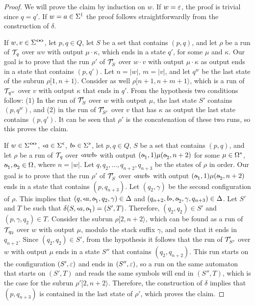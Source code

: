 	\begin{proof}
		We will prove the claim by induction on $w$. If $w = \varepsilon$, the proof is trivial since $q = q'$. If $w = a\in\Sigma^{\texttt{|}}$ the proof follows straightforwardly from the construction of $\delta$.
		
		If $w,v\in\Sigma^{\texttt{<*>}}$, let $p,q\in Q$, let $S$ be a set that contains $(p,q)$, and let $\rho$ be a run of $\mathcal{T}\!_q$ over $wv$ with output $\mu\cdot\kappa$, which ends in a state $q'$, for some $\mu$ and $\kappa$. 
		Our goal is to prove that the run $\rho'$ of $\mathcal{T}\!'_S$ over $w\cdot v$ with output $\mu\cdot \kappa$ as output ends in a state that contains $(p,q')$. 
		Let $n = \vert w\vert$, $m = \vert v \vert$, and let $q^w$ be the last state of the subrun $\rho[1,n+1\rangle$. 
		Consider as well $\rho[n+1,n+m+1\rangle$, which is a run of $\mathcal{T}\!_{q^w}$ over $v$ with output $\kappa$ that ends in $q'$. 
		From the hypothesis two conditions follow: 
		(1) In the run of $\mathcal{T}\!'_S$ over $w$ with output $\mu$, the last state $S'$ contains $(p,q^w)$, and 
		(2) in the run of $\mathcal{T}\!'_{S'}$ over $v$ that has $\kappa$ as output the last state contains $(p,q')$. 
		It can be seen that $\rho'$ is the concatenation of these two runs, so this proves the claim.
		
		If $w\in\Sigma^{\texttt{<*>}}$, ${\scriptsize\texttt{<}} a\in\Sigma^{\texttt{<}}$, $b{\scriptsize\texttt{>}}\in\Sigma^{\texttt{>}}$, let $p,q\in Q$, $S$ be a set that contains $(p,q)$, and let $\rho$ be a run of $\mathcal{T}\!_q$ over ${\scriptsize\texttt{<}} awb{\scriptsize\texttt{>}}$ with output $(\oout_1, 1)\mu(\oout_2, n+2)$ for some $\mu\in\Omega^*$, $\oout_1,\oout_2\in\oalph$, where $n = |w|$. 
		Let $q, q_2, \ldots, q_{n+2}, q_{n+3}$ be the states of $\rho$ in order. 
		Our goal is to prove that the run $\rho'$ of $\mathcal{T}\!'_S$ over ${\scriptsize\texttt{<}} awb{\scriptsize\texttt{>}}$ with output $(\oout_1, 1)\mu(\oout_2, n+2)$ ends in a state that contains $(p,q_{n+3})$. 
		Let $(q_2,\gamma)$ be the second configuration of $\rho$. 
		This implies that $(q,\op{a},\oout_1,q_2,\gamma)\in\Delta$ and $(q_{n+2},\cl{b},\oout_2,\gamma,q_{n+3})\in\Delta$.
		Let $S'$ and $T$ be such that $\delta(S,\op{a},\oout_1) = (S',T)$.
		Therefore, $(q_2,q_2)\in S'$ and $(p,\gamma,q_2)\in T$.
		Consider the subrun $\rho[2,n+2\rangle$, which can be found as a run of $\mathcal{T}\!_{q_2}$ over $w$ with output $\mu$, modulo the stack suffix $\gamma$, and note that it ends in $q_{n+2}$.
		Since $(q_2,q_2)\in S'$, from the hypothesis it follows that the run of $\mathcal{T}\!'_{S'}$ over $w$ with output $\mu$ ends in a state $S''$ that contains $(q_2,q_{n+2})$.
		This run starts on the configuration $(S',\varepsilon)$ and ends in $(S'',\varepsilon)$, so a run on the same automaton that starts on $(S',T)$ and reads the same symbols will end in $(S'', T)$, which is the case for the subrun $\rho'[2,n+2\rangle$.
		Therefore, the construction of $\delta$ implies that $(p,q_{n+3})$ is contained in the last state of $\rho'$, which proves the claim.
	\end{proof}
	
